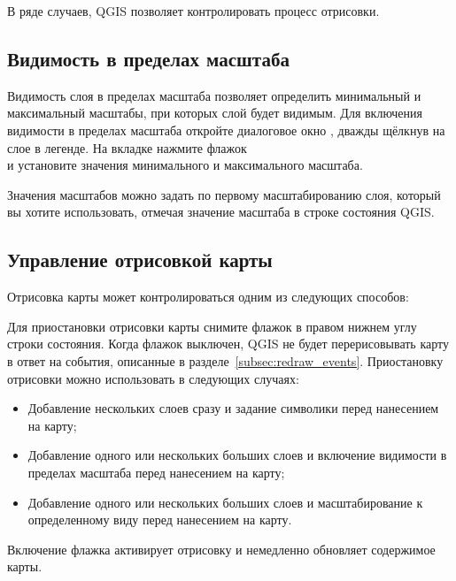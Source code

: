 В ряде случаев, QGIS позволяет контролировать процесс отрисовки.

\subsection{Видимость в пределах масштаба}
\label{label_scaledepend}

Видимость слоя в пределах масштаба позволяет определить минимальный и
максимальный масштабы, при которых слой будет видимым. Для включения
видимости в пределах масштаба откройте диалоговое окно ,
дважды щёлкнув на слое в легенде. На вкладке  нажмите флажок \\
 и установите значения минимального
и максимального масштаба.

Значения масштабов можно задать по первому масштабированию слоя, который
вы хотите использовать, отмечая значение масштаба в строке состояния QGIS.

\subsection{Управление отрисовкой карты}\label{label_controlmap}

Отрисовка карты может контролироваться одним из следующих способов:

\label{label_suspendrender}

Для приостановки отрисовки карты снимите флажок 
в правом нижнем углу строки состояния. Когда флажок 
выключен, QGIS не будет перерисовывать карту в ответ на события,
описанные в разделе~\ref{subsec:redraw_events}. Приостановку отрисовки можно
использовать  в следующих случаях:

\begin{itemize}
\item Добавление нескольких слоев сразу и задание символики перед
нанесением на карту;
\item Добавление одного или нескольких больших слоев и включение видимости
в пределах масштаба перед нанесением на карту;
\item Добавление одного или нескольких больших слоев и масштабирование
к определенному виду перед нанесением на карту.
\end{itemize}

Включение флажка  активирует отрисовку и немедленно
обновляет содержимое карты.

